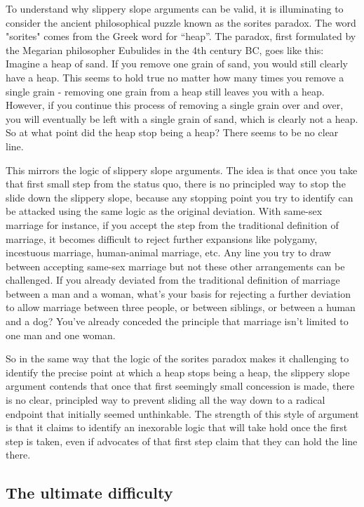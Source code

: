 \documentclass[man,floatsintext]{apa7}
\begin{document}
To understand why slippery slope arguments can be valid, it is illuminating to consider the ancient philosophical puzzle known as the sorites paradox. The word "sorites" comes from the Greek word for ``heap''. The paradox, first formulated by the Megarian philosopher Eubulides in the 4th century BC, goes like this: Imagine a heap of sand. If you remove one grain of sand, you would still clearly have a heap. This seems to hold true no matter how many times you remove a single grain - removing one grain from a heap still leaves you with a heap. However, if you continue this process of removing a single grain over and over, you will eventually be left with a single grain of sand, which is clearly not a heap. So at what point did the heap stop being a heap? There seems to be no clear line.\autocite{hydeSoritesParadox2018}

This mirrors the logic of slippery slope arguments. The idea is that once you take that first small step from the status quo, there is no principled way to stop the slide down the slippery slope, because any stopping point you try to identify can be attacked using the same logic as the original deviation.  With same-sex marriage for instance, if you accept the step from the traditional definition of marriage, it becomes difficult to reject further expansions like polygamy, incestuous marriage, human-animal marriage, etc. Any line you try to draw between accepting same-sex marriage but not these other arrangements can be challenged. If you already deviated from the traditional definition of marriage between a man and a woman, what's your basis for rejecting a further deviation to allow marriage between three people, or between siblings, or between a human and a dog? You've already conceded the principle that marriage isn't limited to one man and one woman.

So in the same way that the logic of the sorites paradox makes it challenging to identify the precise point at which a heap stops being a heap, the slippery slope argument contends that once that first seemingly small concession is made, there is no clear, principled way to prevent sliding all the way down to a radical endpoint that initially seemed unthinkable. The strength of this style of argument is that it claims to identify an inexorable logic that will take hold once the first step is taken, even if advocates of that first step claim that they can hold the line there.

\subsection{The ultimate difficulty}
\end{document}
